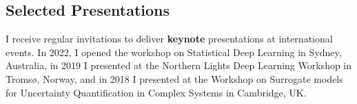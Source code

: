 \documentclass[oneside, a4paper, onecolumn, 10pt]{article}
\begin{document}







\subsection*{Selected Presentations}

I receive regular invitations to deliver {\bf keynote} presentations at international events. 
In 2022, I opened the workshop on Statistical Deep Learning in Sydney, Australia, in 2019 I presented at the Northern Lights Deep Learning Workshop in Troms\o, Norway, and in 2018 I presented at the Workshop on Surrogate models for Uncertainty Quantification in Complex Systems in Cambridge, UK.
\end{document}
